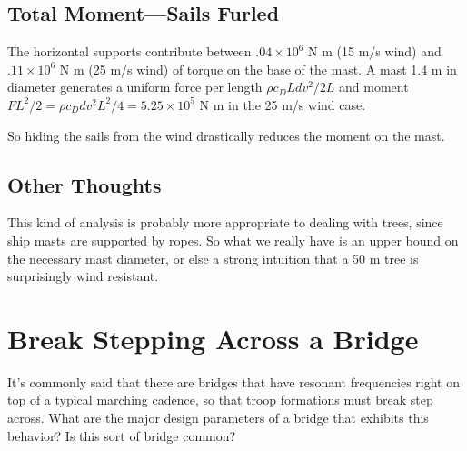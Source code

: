 \documentclass[12pt]{article}
\begin{document}
\subsection{Total Moment---Sails Furled}

The horizontal supports contribute between \(.04 \times 10^6\) N m (15 m/s wind) and \(.11 \times 10^6\) N m (25 m/s wind) of torque on the base of the mast. A mast 1.4 m in diameter generates a uniform force per length \(\rho c_D Ldv^2/2L \) and moment \(FL^2/2 = \rho c_D d v^2 L^2/4 = 5.25 \times 10^5\) N m in the 25 m/s wind case.

So hiding the sails from the wind drastically reduces the moment on the mast.


\subsection{Other Thoughts}

This kind of analysis is probably more appropriate to dealing with trees, since ship masts are supported by ropes. So what we really have is an upper bound on the necessary mast diameter, or else a strong intuition that a 50 m tree is surprisingly wind resistant.

\section{Break Stepping Across a Bridge}

It's commonly said that there are bridges that have resonant frequencies right on top of a typical marching cadence, so that troop formations must break step across. What are the major design parameters of a bridge that exhibits this behavior? Is this sort of bridge common?
\end{document}
